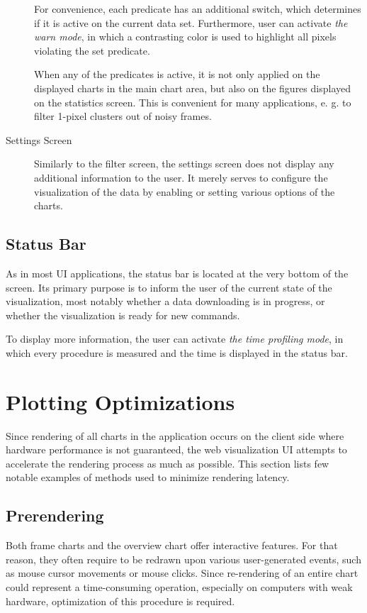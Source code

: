 \begin{description}
	For convenience, each predicate has an additional switch, which determines if it is active on the current data set. Furthermore, user can activate \textit{the warn mode}, in which a contrasting color is used to highlight all pixels violating the set predicate.

	When any of the predicates is active, it is not only applied on the displayed charts in the main chart area, but also on the figures displayed on the statistics screen. This is convenient for many applications, e. g. to filter 1-pixel clusters out of noisy frames.

	\item[Settings Screen]
	Similarly to the filter screen, the settings screen does not display any additional information to the user. It merely serves to configure the visualization of the data by enabling or setting various options of the charts.
\end{description}

\subsection{Status Bar}
As in most UI applications, the status bar is located at the very bottom of the screen. Its primary purpose is to inform the user of the current state of the visualization, most notably whether a data downloading is in progress, or whether the visualization is ready for new commands.

To display more information, the user can activate \textit{the time profiling mode}, in which every procedure is measured and the time is displayed in the status bar.

\section{Plotting Optimizations}
Since rendering of all charts in the application occurs on the client side where hardware performance is not guaranteed, the web visualization UI attempts to accelerate the rendering process as much as possible. This section lists few notable examples of methods used to minimize rendering latency.

\subsection{Prerendering}
Both frame charts and the overview chart offer interactive features. For that reason, they often require to be redrawn upon various user-generated events, such as mouse cursor movements or mouse clicks. Since re-rendering of an entire chart could represent a time-consuming operation, especially on computers with weak hardware, optimization of this procedure is required.

